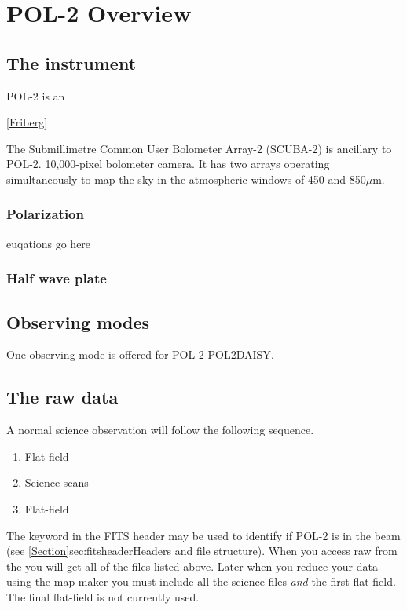 \chapter{POL-2 Overview}
\label{sec:pol2}
\section{The instrument}

POL-2 is an 

\ref{Friberg}


The Submillimetre Common User Bolometer Array-2 (SCUBA-2) is
ancillary to POL-2. 
10,000-pixel bolometer camera. It has two arrays operating
simultaneously to map the sky in the atmospheric windows of 450 and
850$\mu$m. 


\subsection{Polarization}

euqations go here

\subsection*{Half wave plate}


\section{Observing modes}
\label{sec:mmodes}

One observing mode is offered for POL-2 \textsc{POL2DAISY}. 


\section{The raw data}
\label{sec:rawdata}
A normal science observation will follow the following sequence.

\begin{enumerate}\itemsep-0.2em
\item Flat-field
\item Science scans
\item Flat-field
\end{enumerate}

The  keyword in the FITS header may be used to
identify if POL-2 is in the beam (see
\cref{Section}{sec:fitsheader}{Headers and file structure}).  When you
access raw from the  you
will get all of the files listed above. Later when you reduce your
data using the map-maker you must include all the science files
\emph{and} the first flat-field.  The final flat-field is not
currently used.

